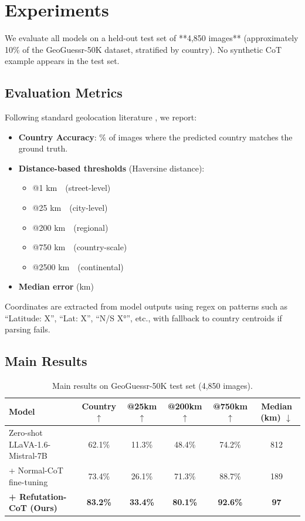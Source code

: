 \documentclass[11pt,a4paper]{article}
\begin{document}
\section{Experiments}
\label{sec:experiments}

We evaluate all models on a held-out test set of **4,850 images** (approximately 10\% of the GeoGuessr-50K dataset, stratified by country). No synthetic CoT example appears in the test set.

\subsection{Evaluation Metrics}

Following standard geolocation literature \cite{weyand2016planet, ayush2021geoclip}, we report:

\begin{itemize}
    \item \textbf{Country Accuracy}: \% of images where the predicted country matches the ground truth.
    \item \textbf{Distance-based thresholds} (Haversine distance):
    \begin{itemize}
        \item @1 km (street-level)
        \item @25 km (city-level)
        \item @200 km (regional)
        \item @750 km (country-scale)
        \item @2500 km (continental)
    \end{itemize}
    \item \textbf{Median error} (km)
\end{itemize}

Coordinates are extracted from model outputs using regex on patterns such as ``Latitude: X'', ``Lat: X'', ``N/S X°'', etc., with fallback to country centroids if parsing fails.

\subsection{Main Results}

\begin{table}[t]
\centering
\caption{Main results on GeoGuessr-50K test set (4,850 images).}
\label{tab:main_results}
\begin{tabular}{lccccc}
\toprule
Model & Country $\uparrow$ & @25km $\uparrow$ & @200km $\uparrow$ & @750km $\uparrow$ & Median (km) $\downarrow$ \\
\midrule
Zero-shot LLaVA-1.6-Mistral-7B      & 62.1\% & 11.3\% & 48.4\% & 74.2\% & 812 \\
+ Normal-CoT fine-tuning            & 73.4\% & 26.1\% & 71.3\% & 88.7\% & 189 \\
\textbf{+ Refutation-CoT (Ours)}    & \textbf{83.2\%} & \textbf{33.4\%} & \textbf{80.1\%} & \textbf{92.6\%} & \textbf{97} \\
\bottomrule
\end{tabular}
\end{table}
\end{document}
